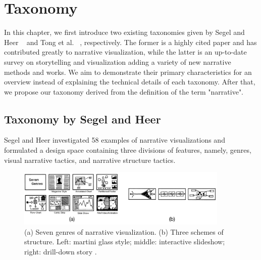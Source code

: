 \chapter{Taxonomy}\label{sec-taxonomy}
In this chapter, we first introduce two existing taxonomies given by Segel and Heer ~\cite{Segel2010} and Tong et al. ~\cite{Tong2018}, respectively. The former is a highly cited paper and has contributed greatly to narrative visualization, while the latter is an up-to-date survey on storytelling and visualization adding a variety of new narrative methods and works. We aim to demonstrate their primary characteristics for an overview instead of explaining the technical details of each taxonomy. After that, we propose our taxonomy derived from the definition of the term "narrative". 

\section{Taxonomy by Segel and Heer}

Segel and Heer \cite{Segel2010} investigated 58 examples of narrative visualizations and formulated a design space containing three divisions of features, namely, genres, visual narrative tactics, and narrative structure tactics. 

\begin{figure}[H]
	\centering 
	\includegraphics[width=0.9\textwidth]{figure/taxonomy1.png} 
	\caption{(a) Seven genres of narrative visualization. (b) Three schemes of structure. Left: martini glass style; middle: interactive slideshow; right: drill-down story \cite{Segel2010}. } 
	\label{taxonomy1} 
\end{figure}

